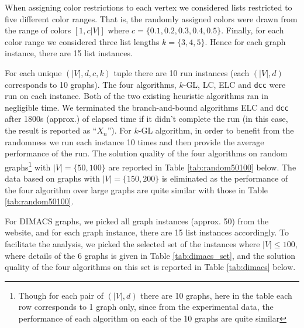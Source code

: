 \documentclass[10pt]{article}
\begin{document}
When assigning color restrictions to 
each vertex we considered lists restricted to five different color ranges.  That is, the randomly
assigned colors were drawn from the range of colors $[1,c|V|]$ where
$c=\{0.1,0.2,0.3, 0.4, 0.5\}$.  Finally, for each color range we considered
three list lengths $k=\{3,4,5\}$. Hence for each graph instance, there are 15 list instances.

For each unique $(|V|,d,c,k)$
tuple there are 10 run instances (each $(|V|, d)$ corresponds to 10 graphs). The four algorithms, $k$-GL, LC, ELC and \texttt{dcc} were run on each instance.  
Both of the two existing heuristic algorithms ran in negligible time. We terminated the branch-and-bound algorithms ELC
and \texttt{dcc} after 1800s (approx.) of elapsed time if it didn't complete the run (in this case, the result is reported as ``$X_n$'').  
For $k$-GL algorithm, in order to benefit from the randomness we run each instance 10 times and then provide the average performance of the run. 
The solution quality of the four algorithms on random graphs\footnote{Though for each pair of $(|V|, d)$ there are 10 graphs, here in the table each 
row corresponds to 1 graph only, since from the experimental data, the performance of each algorithm on each of the 10 graphs are quite similar} with $|V| = \{50, 100 \}$ are reported in Table \ref{tab:random50100} below. The data based on graphs with $|V| = \{150, 200\}$ is eliminated as the performance of the four algorithm over large graphs are quite similar with those in Table \ref{tab:random50100}. 

For DIMACS\cite{dimacs} graphs, we picked all graph instances (approx. 50) from the website, and for each graph instance, there are 15 list instances accordingly.
To facilitate the analysis, we picked the selected set of the instances where $|V| \leq 100$, where details of the 6 graphs is given in Table \ref{tab:dimacs_set}, and the solution quality of the four algorithms on this set
is reported in Table \ref{tab:dimacs} below. 
\end{document}
